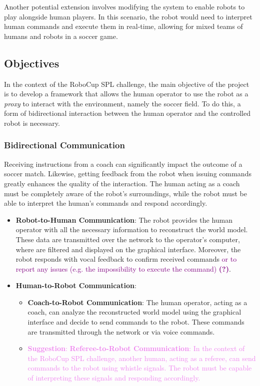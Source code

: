 \documentclass[a4paper, onecolumn, 12pt]{article}
\newcommand\suggestion[1]{\textcolor{violet}{\textbf{Suggestion}: #1}}
\newcommand\doubt[1]{\textcolor{purple}{#1 \textbf{(?)}}}
\begin{document}
Another potential extension involves modifying the system to enable robots to play alongside human players. 
In this scenario, the robot would need to interpret human commands and execute them in real-time, allowing 
for mixed teams of humans and robots in a soccer game.

\subsection{Objectives}
\label{sec:obj}

In the context of the RoboCup SPL challenge, the main objective of the project is to develop a framework
that allows the human operator to use the robot as a \textit{proxy} to interact with the environment, namely the soccer
field. 
To do this, a form of bidirectional interaction between the human operator and the controlled robot is necessary. 

\subsubsection{Bidirectional Communication}  
Receiving instructions from a coach can significantly impact the outcome of a soccer match. 
Likewise, getting feedback from the robot when issuing commands greatly enhances 
the quality of the interaction. The human acting as a coach must be completely aware of the robot's surroundings,
while the robot must be able to interpret the human's commands and respond accordingly. 
\begin{itemize}  
    \item \textbf{Robot-to-Human Communication}: The robot provides the human operator with 
    all the necessary information to reconstruct the world model. These data are transmitted 
    over the network to the operator's computer, where are filtered and displayed on the 
    graphical interface. Moreover, the robot responds with vocal feedback to confirm received 
    commands \doubt{or to report any issues (e.g. the impossibility to execute the command)}.  
    \item \textbf{Human-to-Robot Communication}:  
    \begin{itemize}  
        \item \textbf{Coach-to-Robot Communication}: The human operator, acting as a coach, can 
        analyze the reconstructed world model using the graphical interface and decide to send commands to the robot. 
        These commands are transmitted through the network or via voice commands.  
        \item \suggestion{\textbf{Referee-to-Robot Communication}: In the context of the RoboCup 
        SPL challenge, another human, acting as a referee, can send commands to the robot using 
        whistle signals. The robot must be capable of interpreting these signals and responding 
        accordingly.}  
    \end{itemize}  
\end{itemize}
\end{document}
